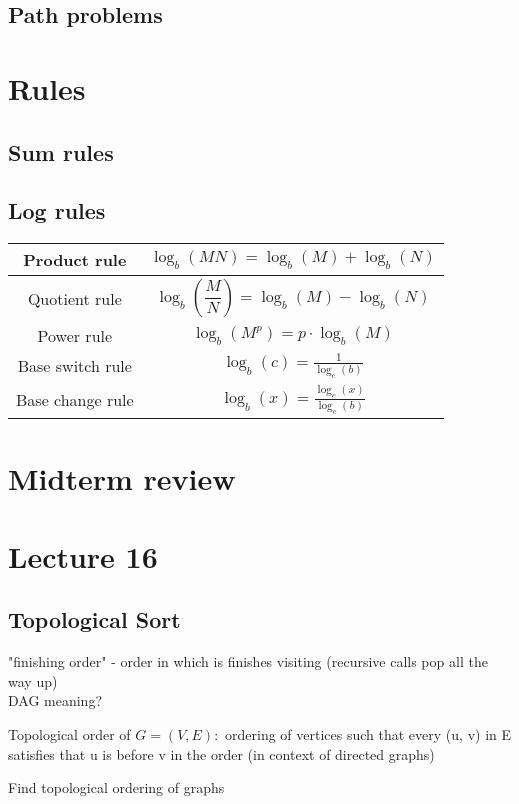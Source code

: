 \documentclass{article}
\begin{document}
\subsection{Path problems}



\section{Rules}
\subsection{Sum rules}
\subsection{Log rules}
\begin{tabular}{|c|c|}
    \hline
    Product rule & $\log_b(MN)=\log_b(M)+\log_b(N)$ \\
    \hline
    Quotient rule & $\log_b\left(\dfrac{M}{N}\right)=\log_b(M)-\log_b(N)$ \\
    \hline Power rule & $\log_b(M^p)=p\cdot\log_b(M)$\\
    \hline Base switch rule & $\log_b(c)=\frac{1}{\log_c(b)}$\\
    \hline Base change rule & $\log_b(x)=\frac{\log_c(x)}{\log_c(b)}$\\
    \hline
    \end{tabular}


\section{Midterm review}


\section{Lecture 16}
\subsection{Topological Sort}
"finishing order" - order in which is finishes visiting (recursive calls pop all the way up)\\
DAG meaning?\\
\begin{definition}
    Topological order of $G = (V, E):$ ordering of vertices such that every (u, v) in E satisfies that u is before v in the order (in context of directed graphs)
\end{definition}
Find topological ordering of graphs
\end{document}
